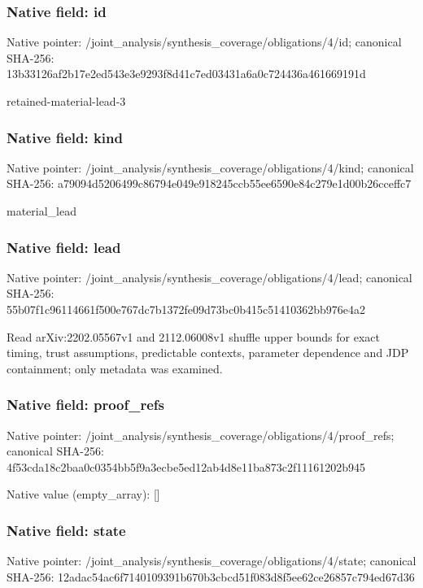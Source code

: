 \documentclass[10pt,a4paper]{article}
\begin{document}
\subsubsection{Native field: id}
Native pointer: /joint\_\allowbreak{}analysis/synthesis\_\allowbreak{}coverage/obligations/4/id; canonical SHA-256: 13b33126af2b17e2ed543e3e9293f8d41c7ed03431a6a0c724436a461669191d

\begingroup\raggedright\sloppy retained-material-lead-3\par\endgroup

\subsubsection{Native field: kind}
Native pointer: /joint\_\allowbreak{}analysis/synthesis\_\allowbreak{}coverage/obligations/4/kind; canonical SHA-256: a79094d5206499c86794e049e918245ccb55ee6590e84c279e1d00b26cceffc7

\begingroup\raggedright\sloppy material\_\allowbreak{}lead\par\endgroup

\subsubsection{Native field: lead}
Native pointer: /joint\_\allowbreak{}analysis/synthesis\_\allowbreak{}coverage/obligations/4/lead; canonical SHA-256: 55b07f1c96114661f500e767dc7b1372fe09d73bc0b415c51410362bb976e4a2

\begingroup\raggedright\sloppy Read arXiv:\allowbreak{}2202.05567v1 and 2112.06008v1 shuffle upper bounds for exact timing,\allowbreak{} trust assumptions,\allowbreak{} predictable contexts,\allowbreak{} parameter dependence and JDP containment;\allowbreak{} only metadata was examined.\par\endgroup

\subsubsection{Native field: proof\_\allowbreak{}refs}
Native pointer: /joint\_\allowbreak{}analysis/synthesis\_\allowbreak{}coverage/obligations/4/proof\_\allowbreak{}refs; canonical SHA-256: 4f53cda18c2baa0c0354bb5f9a3ecbe5ed12ab4d8e11ba873c2f11161202b945

Native value (empty\_\allowbreak{}array): []

\subsubsection{Native field: state}
Native pointer: /joint\_\allowbreak{}analysis/synthesis\_\allowbreak{}coverage/obligations/4/state; canonical SHA-256: 12adac54ac6f7140109391b670b3cbcd51f083d8f5ee62ce26857c794ed67d36
\end{document}
